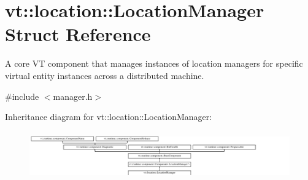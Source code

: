 \hypertarget{structvt_1_1location_1_1_location_manager}{}\section{vt\+:\+:location\+:\+:Location\+Manager Struct Reference}
\label{structvt_1_1location_1_1_location_manager}


A core VT component that manages instances of location managers for specific virtual entity instances across a distributed machine.  




{\ttfamily \#include $<$manager.\+h$>$}

Inheritance diagram for vt\+:\+:location\+:\+:Location\+Manager\+:\begin{figure}[H]
\begin{center}
\leavevmode
\includegraphics[height=2.083333cm]{structvt_1_1location_1_1_location_manager}
\end{center}
\end{figure}
